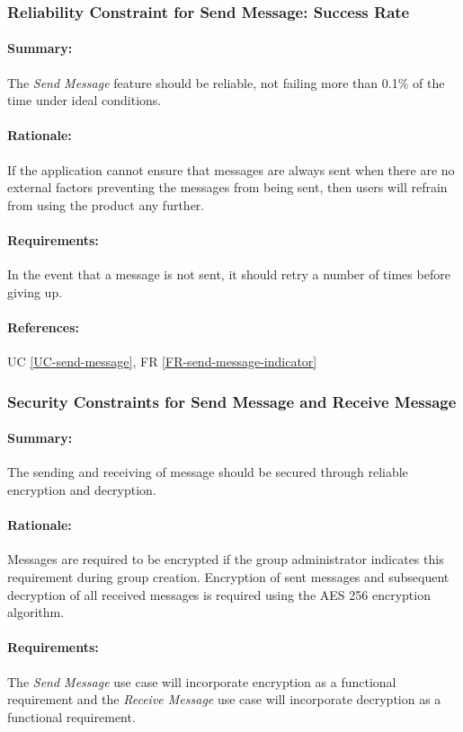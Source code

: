 \documentclass[11pt]{article}
\begin{document}
\subsubsection{Reliability Constraint for Send Message: Success Rate} \label{NFR-reliability-send-message-2}
\paragraph{Summary:} The \textit{Send Message} feature should be reliable, not failing more than 0.1\% of the time under ideal conditions.
\paragraph{Rationale:} If the application cannot ensure that messages are always sent when there are no external factors preventing the messages from being sent, then users will refrain from using the product any further.
\paragraph{Requirements:} In the event that a message is not sent, it should retry a number of times before giving up.
\paragraph{References:} UC \ref{UC-send-message}, FR \ref{FR-send-message-indicator}

\subsubsection{Security Constraints for Send Message and Receive Message} \label{NFR-security-send-message-and-receive-message}
\paragraph{Summary:} The sending and receiving of message should be secured through reliable encryption and decryption.
\paragraph{Rationale:} Messages are required to be encrypted if the group administrator indicates this requirement during group creation. Encryption of sent messages and subsequent decryption of all received messages is required using the AES 256 encryption algorithm. 
\paragraph{Requirements:} The \textit{Send Message} use case will incorporate encryption as a functional requirement and the \textit{Receive Message} use case will incorporate decryption as a functional requirement.
\end{document}
